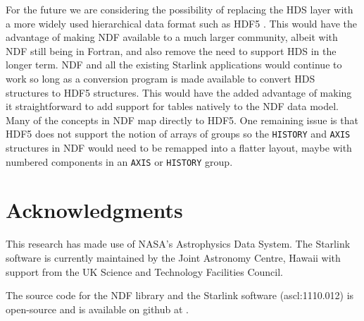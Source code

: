 \documentclass[final,authoryear,5p,times,twocolumn]{elsarticle}
\begin{document}
{For the future we are considering the possibility of replacing the HDS
layer with a more widely used hierarchical data format such as HDF5
\citep{Folk:2011:OHT:1966895.1966900}. This would have the advantage
of making NDF available to a much larger community, albeit with NDF
still being in Fortran, and also remove the
need to support HDS in the longer term. NDF and all the existing
Starlink applications would continue to work so long as a conversion
program is made available to convert HDS structures to HDF5 structures.
This would have the added advantage of making it straightforward to
add support for tables natively to the NDF data model. Many of the
concepts in NDF map directly to HDF5. One remaining issue is that HDF5
does not support the notion of arrays of groups so the
\texttt{HISTORY} and \texttt{AXIS} structures in NDF would need to be
remapped into a flatter layout, maybe with numbered components in an
\texttt{AXIS} or \texttt{HISTORY} group.

\section{Acknowledgments}

This research has made use of NASA's Astrophysics Data System.
The Starlink software is currently maintained by the Joint Astronomy
Centre, Hawaii with support from the UK Science and Technology
Facilities Council.

The source code for the NDF library and the Starlink software
(ascl:1110.012) is open-source and is available on github at
.



}
\end{document}
